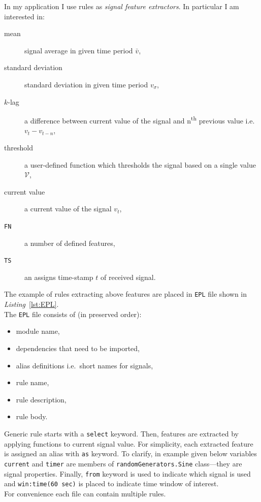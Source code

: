 \documentclass[11pt, letterpaper]{article}            %
\newcommand{\ts}{\textsuperscript}
\begin{document}
In my application I use rules as \emph{signal feature extractors}. In particular I am interested in:
\begin{description}
  \item[mean] signal average in given time period $\bar{v}$,
  \item[standard deviation] standard deviation in given time period $v_\sigma$,
  \item[$k$-lag] a difference between current value of the signal and n\ts{th} previous value i.e.\ $v_t - v_{t-n}$,
  \item[threshold] a user-defined function which thresholds the signal based on a single value $\mathscr{V}$,
  \item[current value] a current value of the signal $v_t$,
  \item[\texttt{FN}] a number of defined features,
  \item[\texttt{TS}] an assigns time-stamp $t$ of received signal.
\end{description}

The example of rules extracting above features are placed in \texttt{EPL} file shown in \emph{Listing}~\ref{lst:EPL}.\\
The \texttt{EPL} file consists of (in preserved order):
\begin{itemize}
  \item module name,
  \item dependencies that need to be imported,
  \item alias definitions i.e.\ short names for signals,
  \item rule name,
  \item rule description,
  \item rule body.
\end{itemize}
Generic rule starts with a \texttt{select} keyword. Then, features are extracted by applying functions to current signal value. For simplicity, each extracted feature is assigned an alias with \texttt{as} keyword. To clarify, in example given below variables \texttt{current} and \texttt{timer} are members of \texttt{randomGenerators.Sine} class---they are signal properties. Finally, \texttt{from} keyword is used to indicate which signal is used and \texttt{win:time(60 sec)} is placed to indicate time window of interest.\\
For convenience each file can contain multiple rules.
\end{document}
